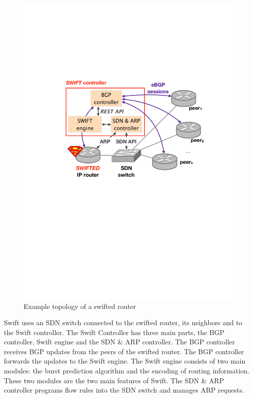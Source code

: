 \begin{figure}[h]
\center
\includegraphics[scale = 0.5]{Figures/bckgrnd_swift_architecture.pdf}
\caption{Example topology of a swifted router}
\end{figure}

Swift uses an SDN switch connected to the swifted router, its neighbors and to the Swift controller. The Swift Controller has three main parts, the  BGP controller, Swift engine and the SDN \& ARP controller. The BGP controller receives BGP updates from the peers of the swifted router. The BGP controller forwards the updates to the Swift engine. The Swift engine consists of two main modules: the burst prediction algorithm and the encoding of routing information. These two modules are the two main features of Swift. The SDN \& ARP controller programs flow rules into the SDN switch and manages ARP requests. 

